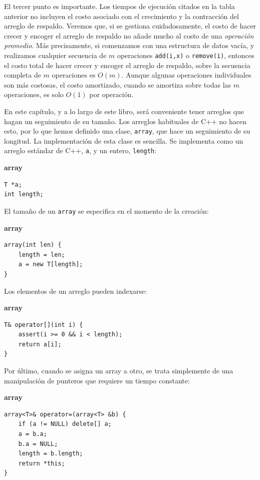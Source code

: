\documentclass[11pt]{book}
\theoremstyle{plain}
\newcommand{\claseheader}[1]{\noindent\textbf{#1}\par\vspace{-4pt}}
\begin{document}
El tercer punto es importante. Los tiempos de ejecución citados en la tabla anterior no incluyen el costo asociado con el crecimiento y la contracción del arreglo de respaldo. Veremos que, si se gestiona cuidadosamente, el costo de hacer crecer y encoger el arreglo de respaldo no añade mucho al costo de una \emph{operación promedio}. Más precisamente, si comenzamos con una estructura de datos vacía, y realizamos cualquier secuencia de $m$ operaciones \texttt{add(i,x)} o \texttt{remove(i)}, entonces el costo total de hacer crecer y encoger el arreglo de respaldo, sobre la secuencia completa de $m$ operaciones es $O(m)$. Aunque algunas operaciones individuales son más costosas, el costo amortizado, cuando se amortiza sobre todas las $m$ operaciones, es solo $O(1)$ por operación.

En este capítulo, y a lo largo de este libro, será conveniente tener arreglos que hagan un seguimiento de su tamaño. Los arreglos habituales de C++ no hacen esto, por lo que hemos definido una clase, \texttt{array}, que hace un seguimiento de su longitud. La implementación de esta clase es sencilla. Se implementa como un arreglo estándar de C++, \texttt{a}, y un entero, \texttt{length}:

\claseheader{array}
\begin{lstlisting}
T *a;
int length;
\end{lstlisting}

El tamaño de un \texttt{array} se especifica en el momento de la creación:

\claseheader{array}
\begin{lstlisting}
array(int len) {
    length = len;
    a = new T[length];
}
\end{lstlisting}

Los elementos de un arreglo pueden indexarse:

\claseheader{array}
\begin{lstlisting}
T& operator[](int i) {
    assert(i >= 0 && i < length);
    return a[i];
}
\end{lstlisting}

Por último, cuando se asigna un array a otro, se trata simplemente de una manipulación de punteros que requiere un tiempo constante:

\claseheader{array}
\begin{lstlisting}
array<T>& operator=(array<T> &b) {
    if (a != NULL) delete[] a;
    a = b.a;
    b.a = NULL;
    length = b.length;
    return *this;
}
\end{lstlisting}
\end{document}
